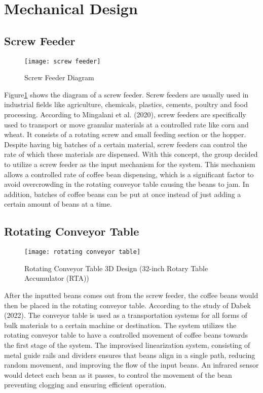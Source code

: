 \section{Mechanical Design}

\subsection{Screw Feeder}
\begin{figure}[h]
\centering
\texttt{[image: screw feeder]} %
\caption{Screw Feeder Diagram}
\label{fig:screw_feeder}
\end{figure}

Figure\ref{fig:screw_feeder} shows the diagram of a screw feeder. Screw feeders are usually used in industrial fields like agriculture, chemicals, plastics, cements, poultry and food processing. According to Mingalani et al. (2020), screw feeders are specifically used to transport or move granular materials at a controlled rate like corn and wheat. It consists of a rotating screw and small feeding section or the hopper. Despite having big batches of a certain material, screw feeders can control the rate of which these materials are dispensed. With this concept, the group decided to utilize a screw feeder as the input mechanism for the system. This mechanism allows a controlled rate of coffee bean dispensing, which is a significant factor to avoid overcrowding in the rotating conveyor table causing the beans to jam. In addition, batches of coffee beans can be put at once instead of just adding a certain amount of beans at a time. 

\subsection{Rotating Conveyor Table}
\begin{figure}[h]
    \centering
    \texttt{[image: rotating conveyor table]} %
    \caption{Rotating Conveyor Table 3D Design (32-inch Rotary Table Accumulator (RTA))}
    \label{fig:rotating_conveyor_table}
\end{figure}

After the inputted beans comes out from the screw feeder, the coffee beans would then be placed in the rotating conveyor table. According to the study of Dabek (2022). The conveyor table is used as a transportation systems for all forms of bulk materials to a certain machine or destination. The system utilizes the rotating conveyor table to have a controlled movement of coffee beans towards the first stage of the system. The improvised linearization system, consisting of metal guide rails and dividers ensures that beans align in a single path, reducing random movement, and improving the flow of the input beans. An infrared sensor would detect each bean as it passes, to control the movement of the bean preventing clogging and ensuring efficient operation. 

